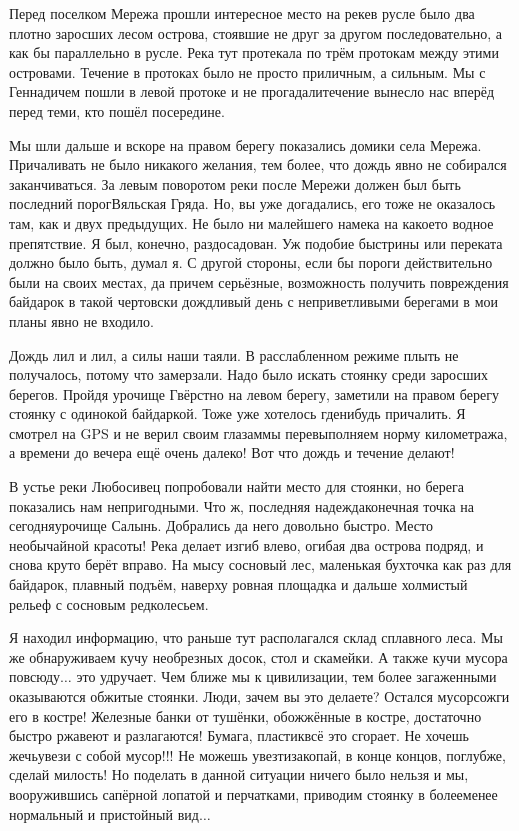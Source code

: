 Перед поселком Мережа прошли интересное место на реке\mdash в русле было два плотно заросших лесом острова, стоявшие не друг за другом последовательно, а как бы параллельно в русле. Река тут протекала по трём протокам между этими островами. Течение в протоках было не просто приличным, а сильным. Мы с Геннадичем пошли в левой протоке и не прогадали\mdash течение вынесло нас вперёд перед теми, кто пошёл посередине.

Мы шли дальше и вскоре на правом берегу показались домики села Мережа. Причаливать не было никакого желания, тем более, что дождь явно не собирался заканчиваться. За левым поворотом реки после Мережи должен был быть последний порог\mdash Вяльская Гряда. Но, вы уже догадались, его тоже не оказалось там, как и двух предыдущих. Не было ни малейшего намека на какое\sdash то водное препятствие. Я был, конечно, раздосадован. Уж подобие быстрины или переката должно было быть, думал я. С другой стороны, если бы пороги действительно были на своих местах, да причем серьёзные, возможность получить повреждения байдарок в такой чертовски дождливый день с неприветливыми берегами в мои планы явно не входило.

Дождь лил и лил, а силы наши таяли. В расслабленном режиме плыть не получалось, потому что замерзали. Надо было искать стоянку среди заросших берегов. Пройдя урочище Гвёрстно на левом берегу, заметили на правом берегу стоянку с одинокой байдаркой.  Тоже уже хотелось где\sdash нибудь причалить. Я смотрел на GPS и не верил своим глазам\mdash мы перевыполняем норму километража, а времени до вечера ещё очень далеко! Вот что дождь и течение делают! 

В устье реки Любосивец попробовали найти место для стоянки, но берега показались нам непригодными. Что ж, последняя надежда\mdash конечная точка на сегодня\mdash урочище Салынь. Добрались да него довольно быстро. Место необычайной красоты! Река делает изгиб влево, огибая два острова подряд, и снова круто берёт вправо. На мысу сосновый лес, маленькая бухточка как раз для байдарок, плавный подъём, наверху ровная площадка и дальше холмистый рельеф с сосновым редколесьем. 

Я находил информацию, что раньше тут располагался склад сплавного леса. Мы же обнаруживаем кучу необрезных досок, стол и скамейки. А также кучи мусора повсюду$\ldots$ это удручает. Чем ближе мы к цивилизации, тем более загаженными оказываются обжитые стоянки. Люди, зачем вы это делаете? Остался мусор\mdash сожги его в костре! Железные банки от тушёнки, обожжённые в костре, достаточно быстро ржавеют и разлагаются! Бумага, пластик\mdash всё это сгорает. Не хочешь жечь\mdash увези с собой мусор!!! Не можешь увезти\mdash закопай, в конце концов, поглубже, сделай милость! Но поделать в данной ситуации ничего было нельзя и мы, вооружившись сапёрной лопатой и перчатками, приводим стоянку в более\sdash менее нормальный и пристойный вид$\ldots$ 

